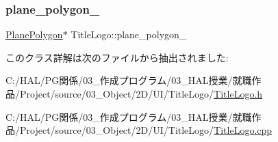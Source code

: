 \subsubsection{\texorpdfstring{plane\+\_\+polygon\+\_\+}{plane\_polygon\_}}
{\footnotesize\ttfamily \mbox{\hyperlink{class_plane_polygon}{Plane\+Polygon}}$\ast$ Title\+Logo\+::plane\+\_\+polygon\+\_\+}



このクラス詳解は次のファイルから抽出されました\+:\begin{DoxyCompactItemize}
\item 
C\+:/\+H\+A\+L/\+P\+G関係/03\+\_\+作成プログラム/03\+\_\+\+H\+A\+L授業/就職作品/\+Project/source/03\+\_\+\+Object/2\+D/\+U\+I/\+Title\+Logo/\mbox{\hyperlink{_title_logo_8h}{Title\+Logo.\+h}}\item 
C\+:/\+H\+A\+L/\+P\+G関係/03\+\_\+作成プログラム/03\+\_\+\+H\+A\+L授業/就職作品/\+Project/source/03\+\_\+\+Object/2\+D/\+U\+I/\+Title\+Logo/\mbox{\hyperlink{_title_logo_8cpp}{Title\+Logo.\+cpp}}\end{DoxyCompactItemize}
